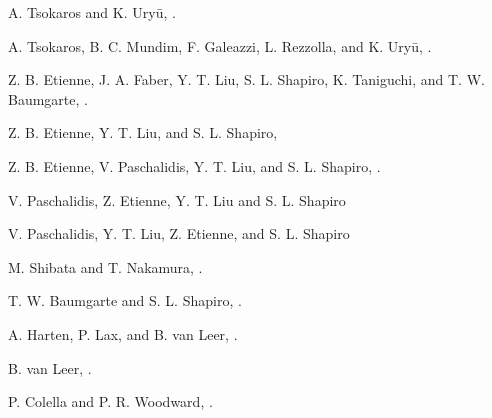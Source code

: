 A. Tsokaros and K. Ury\=u, .

A. Tsokaros, B. C. Mundim, F. Galeazzi, L. Rezzolla, and K. Ury\=u, .

Z. B. Etienne, J. A. Faber, Y. T. Liu, S. L. Shapiro, K. Taniguchi, and T. W. Baumgarte, .

Z. B. Etienne, Y. T. Liu, and S. L. Shapiro, 

Z. B. Etienne, V. Paschalidis, Y. T. Liu, and S. L. Shapiro,  .

V. Paschalidis, Z. Etienne, Y. T. Liu and S. L. Shapiro 

V. Paschalidis, Y. T. Liu, Z. Etienne, and S. L. Shapiro 

M. Shibata and T. Nakamura, .

T. W. Baumgarte and S. L. Shapiro, .

A. Harten, P. Lax, and B. van Leer, .

B. van Leer, .

P. Colella and P. R. Woodward, .


